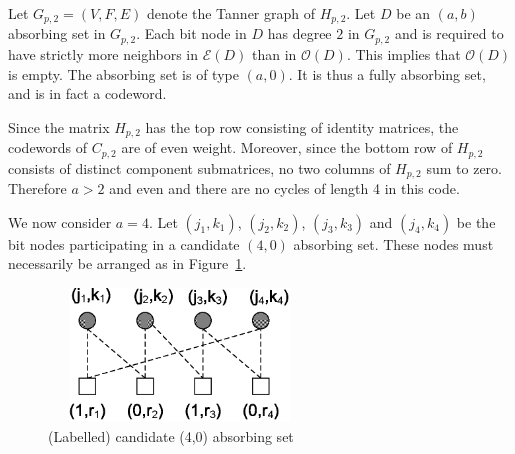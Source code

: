 Let $G_{p,2}=(V,F,E)$ denote the Tanner graph of $H_{p,2}$. Let
$D$ be an $(a,b)$ absorbing set in $G_{p,2}$. Each bit node in $D$
has degree $2$ in $G_{p,2}$ and is required to have strictly more
neighbors in $\mathcal{E}(D)$ than in $\mathcal{O}(D)$. This
implies that $\mathcal{O}(D)$ is empty. The absorbing set is of
type $(a,0)$. It is thus a fully absorbing set, and is in fact a
codeword.

Since the matrix $H_{p,2}$ has the top row consisting of identity
matrices, the codewords of $C_{p,2}$ are of even weight. Moreover,
since the bottom row of $H_{p,2}$ consists of distinct component
submatrices, no two columns of $H_{p,2}$ sum to zero. Therefore
$a>2$ and even and there are no cycles of length 4 in this code.

We now consider $a = 4$. Let $(j_1,k_1)$, $(j_2,k_2)$, $(j_3,k_3)$
and $(j_4,k_4)$ be the bit nodes participating in a candidate
$(4,0)$ absorbing set. These nodes must necessarily be arranged as
in Figure~\ref{Fig03}.%
\begin{figure}
\center\includegraphics[width=2.75in,height=1.4in]{Visio-fig03z.eps}%
\caption{(Labelled) candidate (4,0) absorbing set}\label{Fig03}
\end{figure}

